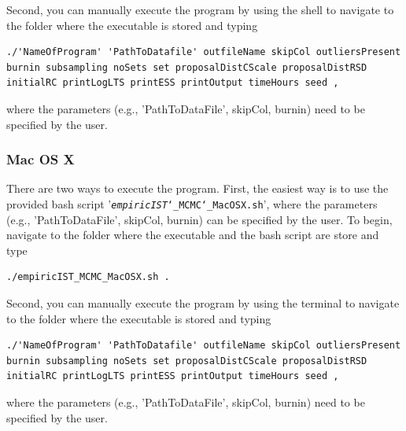 \documentclass[12pt,a4paper]{scrartcl}
\begin{document}
Second, you can manually execute the program by using the shell to navigate to the folder where the executable is stored and typing
 \begin{lstlisting}[breaklines=true] 
./'NameOfProgram' 'PathToDatafile' outfileName skipCol outliersPresent burnin subsampling noSets set proposalDistCScale proposalDistRSD initialRC printLogLTS printESS printOutput timeHours seed ,
\end{lstlisting}  
where the parameters (e.g., 'PathToDataFile', skipCol, burnin) need to be specified by the user. 

\subsubsection*{Mac OS X}
 
There are two ways to execute the program.  First, the easiest way is to use the provided bash script  '\texttt{\emph{empiricIST}\char`_MCMC\char`_MacOSX.sh}', where the parameters (e.g., 'PathToDataFile', skipCol, burnin) can be specified by the user.
To begin, navigate to the folder where the executable and the bash script are store and type
\begin{lstlisting}
./empiricIST_MCMC_MacOSX.sh .
\end{lstlisting} 

Second, you can manually execute the program by using the terminal to navigate to the folder where the executable is stored and typing 
 \begin{lstlisting}[breaklines=true] 
./'NameOfProgram' 'PathToDatafile' outfileName skipCol outliersPresent burnin subsampling noSets set proposalDistCScale proposalDistRSD initialRC printLogLTS printESS printOutput timeHours seed ,
\end{lstlisting}  
where the parameters (e.g., 'PathToDataFile', skipCol, burnin) need to be specified by the user. 
\end{document}
